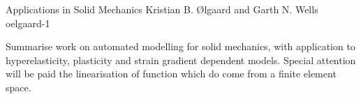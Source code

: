               {Applications in Solid Mechanics}
              {Kristian B. {\O}lgaard and Garth N. Wells}
              {oelgaard-1}

Summarise work on automated modelling for solid mechanics, with
application to hyperelasticity, plasticity and strain gradient
dependent models. Special attention will be paid the linearisation of
function which do come from a finite element space.
